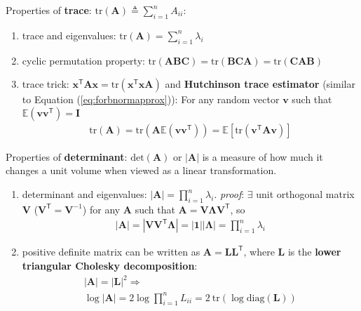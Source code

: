 Properties of \textbf{trace}: $\mathrm{tr}(\mathbf{A})\triangleq\sum_{i=1}^n A_{ii}$:
\begin{enumerate}[{(1)}]
    \item trace and eigenvalues: $\mathrm{tr}(\mathbf{A})=\sum_{i=1}^n\lambda_i$
    
    \item cyclic permutation property: $\mathrm{tr}(\mathbf{ABC})=\mathrm{tr}(\mathbf{BCA})=\mathrm{tr}(\mathbf{CAB})$
    
    \item trace trick: $\bm{x}^\mathsf{T}\mathbf{A}\bm{x}=\mathrm{tr}(\bm{x}^\mathsf{T}\bm{x}\mathbf{A})$
    and \textbf{Hutchinson trace estimator} (similar to Equation (\ref{eq:forbnormapprox})):
    For any random vector $\bm{v}$ such that $\mathbb{E}(\bm{vv}^\mathsf{T})=\mathbf{I}$
    \begin{gather}
        \mathrm{tr}(\mathbf{A})
        = \mathrm{tr}(\mathbf{A}\mathbb{E}(\bm{vv}^\mathsf{T}))
        = \mathbb{E}[\mathrm{tr}(\bm{v}^\mathsf{T}\mathbf{A}\bm{v})]
    \end{gather}
\end{enumerate}

Properties of \textbf{determinant}: 
$\mathrm{det}(\mathbf{A})$ or $|\mathbf{A}|$ is a measure of how much it changes a unit volume when viewed as a linear transformation.
\begin{enumerate}[{(1)}]
    \item determinant and eigenvalues: $|\mathbf{A}|=\prod_{i=1}^n\lambda_i$. 
    \textit{proof}: 
    $\exists$ unit orthogonal matrix $\mathbf{V}$ ($\mathbf{V}^\mathsf{T}=\mathbf{V}^{-1}$) 
    for any $\mathbf{A}$ 
    such that $\mathbf{A}=\mathbf{V\Lambda V}^\mathsf{T}$,
    so
    \begin{gather}
        |\mathbf{A}|=|\mathbf{VV}^\mathsf{T}\mathbf{\Lambda}|=|\mathbf{1}||\mathbf{\Lambda}|=\prod_{i=1}^n\lambda_i
    \end{gather}
    
    \item positive definite matrix can be written as $\mathbf{A}=\mathbf{LL}^\mathsf{T}$, 
    where $\mathbf{L}$ is the \textbf{lower triangular Cholesky decomposition}:
    \begin{gather}
        |\mathbf{A}|=|\mathbf{L}|^2 \Rightarrow\\
        \log{|\mathbf{A}|}=2\log\prod_{i=1}^n L_{ii}=2~\mathrm{tr}(\log\mathrm{diag}(\mathbf{L}))
    \end{gather}
\end{enumerate}

